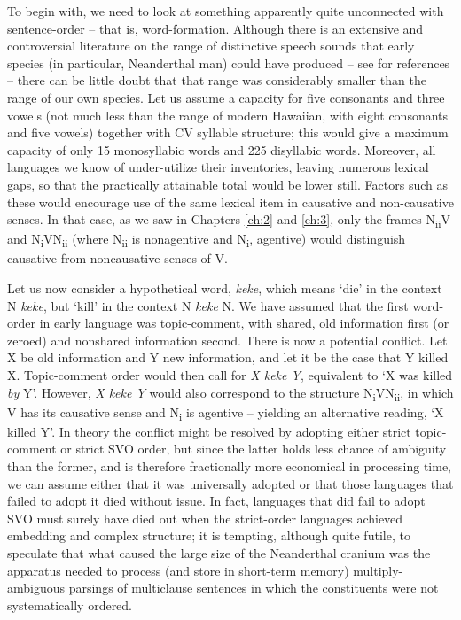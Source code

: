 To begin with, we need to look at something apparently quite unconnected with sentence-order -- that is, word-formation. Although there is an extensive and controversial literature on the range of distinctive speech sounds that early species (in particular, Neanderthal man) could have produced -- see \citet{Spuhler1977} for references -- there can be little doubt that that range was considerably smaller than the range of our own species. Let us assume a capacity for five consonants and three vowels (not much less than the range of modern Hawaiian, with eight consonants and five vowels) together with CV syllable structure; this would give a maximum capacity of only 15 monosyllabic words and 225 disyllabic words. Moreover, all languages we know of under-utilize their inventories, leaving numerous lexical gaps, so that the practically attainable total would be lower still. Factors such as these would encourage use of the same lexical item in causative and non-causative senses. In that case, as we saw in Chapters \ref{ch:2} and \ref{ch:3}, only the frames N\textsubscript{ii}V and N\textsubscript{i}VN\textsubscript{ii} (where N\textsubscript{ii} is nonagentive and N\textsubscript{i}, agentive) would distinguish causative from noncausative senses of V.

Let us now consider a hypothetical word, \textit{keke}, which means `die' in the context N \textit{keke}, but `kill' in the context N \textit{keke} N. We have assumed that the first word-order in early language was topic-comment,
with shared, old information first (or zeroed) and nonshared information second. There is now a potential conflict. Let X be old information and Y new information, and let it be the case that Y killed X. Topic-comment order would then call for \textit{X keke Y}, equivalent to `X was killed \textit{by} Y'. However, \textit{X keke Y} would also correspond to the structure N\textsubscript{i}VN\textsubscript{ii}, in which V has its causative sense and N\textsubscript{i} is agentive -- yielding an alternative reading, `X killed Y'. In theory the conflict might be resolved by adopting either strict topic-comment or strict SVO order, but since the latter holds less chance of ambiguity than the former, and is therefore fractionally more economical in processing time, we can assume either that it was universally adopted or that those languages that failed to adopt it died without issue. In fact, languages that did fail to adopt SVO must surely have died out when the strict-order languages achieved embedding and complex structure; it is tempting, although quite futile, to speculate that what caused the large size of the Neanderthal cranium was the apparatus needed to process (and store in short-term memory) multiply-ambiguous parsings of multiclause sentences in which the constituents were not systematically ordered.

